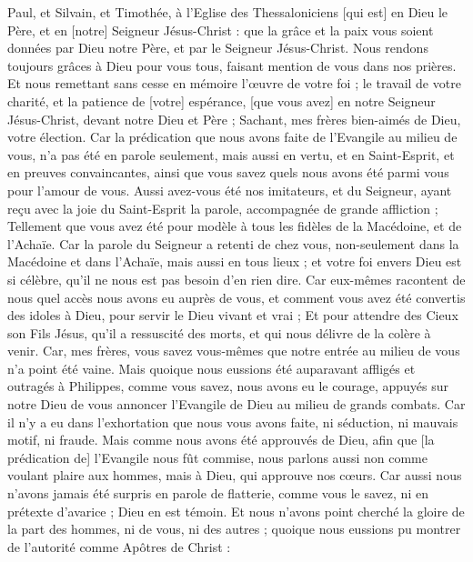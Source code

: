 \BFont
\begin{multicols}{2}
\VerseOne{}Paul, et Silvain, et Timothée, à l'Eglise des Thessaloniciens [qui est] en Dieu le Père, et en [notre] Seigneur Jésus-Christ : que la grâce et la paix vous soient données par Dieu notre Père, et par le Seigneur Jésus-Christ.
Nous rendons toujours grâces à Dieu pour vous tous, faisant mention de vous dans nos prières.
Et nous remettant sans cesse en mémoire l'œuvre de votre foi ; le travail de votre charité, et la patience de [votre] espérance, [que vous avez] en notre Seigneur Jésus-Christ, devant notre Dieu et Père ;
Sachant, mes frères bien-aimés de Dieu, votre élection.
Car la prédication que nous avons faite de l'Evangile au milieu de vous, n'a pas été en parole seulement, mais aussi en vertu, et en Saint-Esprit, et en preuves convaincantes, ainsi que vous savez quels nous avons été parmi vous pour l'amour de vous.
Aussi avez-vous été nos imitateurs, et du Seigneur, ayant reçu avec la joie du Saint-Esprit la parole, accompagnée de grande affliction ;
Tellement que vous avez été pour modèle à tous les fidèles de la Macédoine, et de l'Achaïe.
Car la parole du Seigneur a retenti de chez vous, non-seulement dans la Macédoine et dans l'Achaïe, mais aussi en tous lieux ; et votre foi envers Dieu est si célèbre, qu'il ne nous est pas besoin d'en rien dire.
Car eux-mêmes racontent de nous quel accès nous avons eu auprès de vous, et comment vous avez été convertis des idoles à Dieu, pour servir le Dieu vivant et vrai ;
Et pour attendre des Cieux son Fils Jésus, qu'il a ressuscité des morts, et qui nous délivre de la colère à venir.
\VerseOne{}Car, mes frères, vous savez vous-mêmes que notre entrée au milieu de vous n'a point été vaine.
Mais quoique nous eussions été auparavant affligés et outragés à Philippes, comme vous savez, nous avons eu le courage, appuyés sur notre Dieu de vous annoncer l'Evangile de Dieu au milieu de grands combats.
Car il n'y a eu dans l'exhortation que nous vous avons faite, ni séduction, ni mauvais motif, ni fraude.
Mais comme nous avons été approuvés de Dieu, afin que [la prédication de] l'Evangile nous fût commise, nous parlons aussi non comme voulant plaire aux hommes, mais à Dieu, qui approuve nos cœurs.
Car aussi nous n'avons jamais été surpris en parole de flatterie, comme vous le savez, ni en prétexte d'avarice ; Dieu en est témoin.
Et nous n'avons point cherché la gloire de la part des hommes, ni de vous, ni des autres ; quoique nous eussions pu montrer de l'autorité comme Apôtres de Christ :

\end{multicols}
